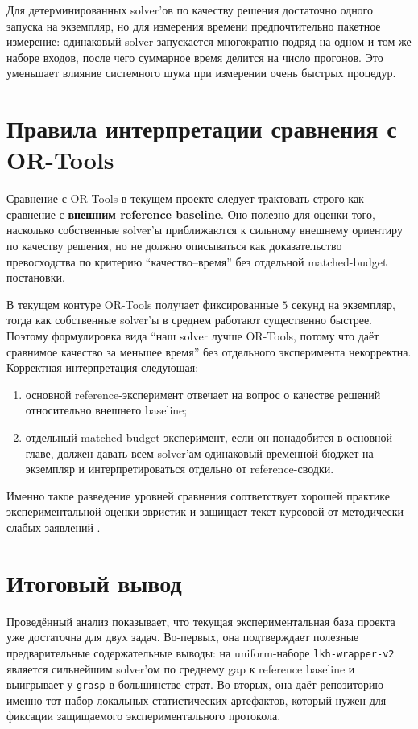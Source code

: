 \begin{refsection}
Для детерминированных solver'ов по качеству решения достаточно одного запуска на экземпляр, но для измерения времени предпочтительно пакетное измерение: одинаковый solver запускается многократно подряд на одном и том же наборе входов, после чего суммарное время делится на число прогонов. Это уменьшает влияние системного шума при измерении очень быстрых процедур.

\section{Правила интерпретации сравнения с OR-Tools}

Сравнение с OR-Tools в текущем проекте следует трактовать строго как сравнение с \textbf{внешним reference baseline}. Оно полезно для оценки того, насколько собственные solver'ы приближаются к сильному внешнему ориентиру по качеству решения, но не должно описываться как доказательство превосходства по критерию ``качество--время'' без отдельной matched-budget постановки.

В текущем контуре OR-Tools получает фиксированные \(5\) секунд на экземпляр, тогда как собственные solver'ы в среднем работают существенно быстрее. Поэтому формулировка вида ``наш solver лучше OR-Tools, потому что даёт сравнимое качество за меньшее время'' без отдельного эксперимента некорректна. Корректная интерпретация следующая:
\begin{enumerate}[label=\arabic*.]
  \item основной reference-эксперимент отвечает на вопрос о качестве решений относительно внешнего baseline;
  \item отдельный matched-budget эксперимент, если он понадобится в основной главе, должен давать всем solver'ам одинаковый временной бюджет на экземпляр и интерпретироваться отдельно от reference-сводки.
\end{enumerate}

Именно такое разведение уровней сравнения соответствует хорошей практике экспериментальной оценки эвристик и защищает текст курсовой от методически слабых заявлений \cite{hooker1995,johnson1999}.

\section{Итоговый вывод}

Проведённый анализ показывает, что текущая экспериментальная база проекта уже достаточна для двух задач. Во-первых, она подтверждает полезные предварительные содержательные выводы: на uniform-наборе \texttt{lkh-wrapper-v2} является сильнейшим solver'ом по среднему gap к reference baseline и выигрывает у \texttt{grasp} в большинстве страт. Во-вторых, она даёт репозиторию именно тот набор локальных статистических артефактов, который нужен для фиксации защищаемого экспериментального протокола.


\end{refsection}
